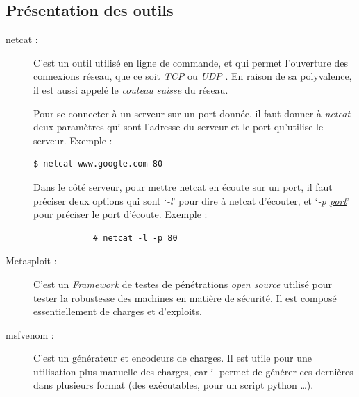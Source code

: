     \subsection{Présentation des outils}
    \begin{description}
        \item[netcat :] C'est un outil utilisé en ligne de commande, et qui permet l'ouverture des connexions
            réseau, que ce soit \emph{TCP} \cite{reseau} ou \emph{UDP} \cite{reseau}. En raison de sa polyvalence,
            il est aussi appelé le \emph{couteau suisse} du réseau.

            Pour se connecter à un serveur sur un port donnée, il faut donner à \emph{netcat} deux paramètres qui sont 
            l'adresse du serveur et le port qu'utilise le serveur. Exemple :
            \begin{lstlisting}[language=bash] 
            $ netcat www.google.com 80
            \end{lstlisting}

            Dans le côté serveur, pour mettre netcat en écoute sur un port, il faut préciser deux options qui sont 
            `\emph{-l}' pour dire à netcat d'écouter, et `\emph{-p \ul{port}}' pour préciser le port d'écoute.
            Exemple :
            \begin{lstlisting}
            # netcat -l -p 80   
            \end{lstlisting}

        \item[Metasploit :] C'est un \emph{Framework} de testes de pénétrations \emph{open source} utilisé pour 
            tester la robustesse des machines en matière de sécurité. Il est composé essentiellement de charges 
            et d'exploits. 

        \item[msfvenom :] \label{msfvenom} C'est un générateur et encodeurs de charges. Il est utile pour une utilisation plus manuelle
            des charges, car il permet de générer ces dernières dans plusieurs format (des exécutables, pour un 
            script python \ldots{}). 


\end{description}
